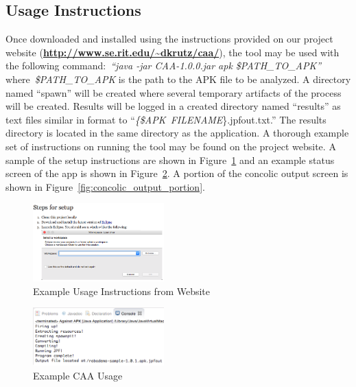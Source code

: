 \documentclass{sig-alternate-05-2015}
\begin{document}
\vspace{10mm} %
\subsection{Usage Instructions}

Once downloaded and installed using the instructions provided on our project website (\textbf{\url{http://www.se.rit.edu/~dkrutz/caa/}}), the tool may be used with the following command:~\emph{``java -jar CAA-1.0.0.jar \-apk \$PATH\_TO\_APK''} where~\emph{\$PATH\_TO\_APK} is the path to the APK file to be analyzed. A directory named ``spawn'' will be created where several temporary artifacts of the process will be created. Results will be logged in a created directory named ``results'' as text files similar in format to ``\emph{\{\$APK~FILENAME}\}.jpfout.txt.'' The results directory is located in the same directory as the application. A thorough example set of instructions on running the tool may be found on the project website. A sample of the setup instructions are shown in Figure~\ref{fig:CAAinstructions} and an example status screen of the app is shown in Figure~\ref{fig:usingCAA}. A portion of the concolic output screen is shown in Figure~\ref{fig:concolic_output_portion}.





\begin{figure}[ht!]
\centering
\includegraphics[width=0.45\textwidth]{images/instructionsscreenshot.png}
\caption{Example Usage Instructions from Website}
\label{fig:CAAinstructions}
\end{figure}


\begin{figure}[ht!]
\centering
\includegraphics[width=0.45\textwidth]{images/CAA_Eclipse_small.png}
\caption{Example CAA Usage}
\label{fig:usingCAA}
\end{figure}
\end{document}
